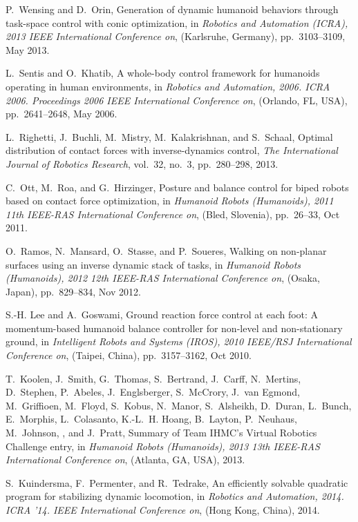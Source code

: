 \documentclass{ws-ijhr}
\begin{document}
\begin{thebibliography}{10}
P.~Wensing and D.~Orin, Generation of dynamic humanoid behaviors through
  task-space control with conic optimization, in {\em Robotics and Automation
  (ICRA), 2013 IEEE International Conference on}, (Karlsruhe, Germany),
  pp.~3103--3109, May 2013.

L.~Sentis and O.~Khatib, A whole-body control framework for humanoids
  operating in human environments, in {\em Robotics and Automation, 2006.
  ICRA 2006. Proceedings 2006 IEEE International Conference on}, (Orlando, FL,
  USA), pp.~2641--2648, May 2006.

L.~Righetti, J.~Buchli, M.~Mistry, M.~Kalakrishnan, and S.~Schaal, Optimal
  distribution of contact forces with inverse-dynamics control, {\em The
  International Journal of Robotics Research}, vol.~32, no.~3, pp.~280--298,
  2013.

C.~Ott, M.~Roa, and G.~Hirzinger, Posture and balance control for biped
  robots based on contact force optimization, in {\em Humanoid Robots
  (Humanoids), 2011 11th IEEE-RAS International Conference on}, (Bled,
  Slovenia), pp.~26--33, Oct 2011.

O.~Ramos, N.~Mansard, O.~Stasse, and P.~Soueres, Walking on non-planar
  surfaces using an inverse dynamic stack of tasks, in {\em Humanoid Robots
  (Humanoids), 2012 12th IEEE-RAS International Conference on}, (Osaka, Japan),
  pp.~829--834, Nov 2012.

S.-H. Lee and A.~Goswami, Ground reaction force control at each foot: A
  momentum-based humanoid balance controller for non-level and non-stationary
  ground, in {\em Intelligent Robots and Systems (IROS), 2010 IEEE/RSJ
  International Conference on}, (Taipei, China), pp.~3157--3162, Oct 2010.

T.~Koolen, J.~Smith, G.~Thomas, S.~Bertrand, J.~Carff, N.~Mertins, D.~Stephen,
  P.~Abeles, J.~Englsberger, S.~McCrory, J.~van Egmond, M.~Griffioen, M.~Floyd,
  S.~Kobus, N.~Manor, S.~Alsheikh, D.~Duran, L.~Bunch, E.~Morphis,
  L.~Colasanto, K.-L.~H. Hoang, B.~Layton, P.~Neuhaus, M.~Johnson, , and
  J.~Pratt, Summary of {Team} {IHMC’s} {Virtual Robotics Challenge}
  entry, in {\em Humanoid Robots (Humanoids), 2013 13th IEEE-RAS
  International Conference on}, (Atlanta, GA, USA), 2013.

S.~Kuindersma, F.~Permenter, and R.~Tedrake, An efficiently solvable
  quadratic program for stabilizing dynamic locomotion, in {\em Robotics and
  Automation, 2014. ICRA '14. IEEE International Conference on}, (Hong Kong,
  China), 2014.


\end{thebibliography}
\end{document}

